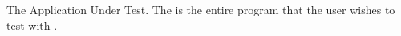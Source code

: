 \item[\gdaut] {
The Application Under Test. The \gdaut is the entire program that the user wishes to test with \jb{}.  
}